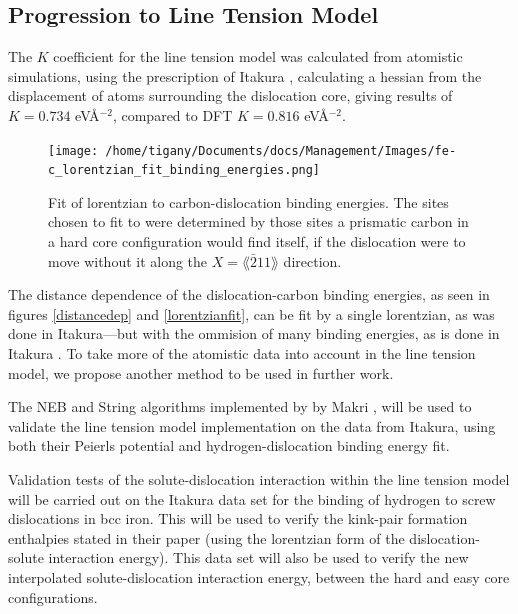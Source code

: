 \documentclass[a4paper,11pt]{article}
\begin{document}
\subsection{Progression to Line Tension Model}
\label{sec:org66fee0b}


The \(K\) coefficient for the line tension model  was calculated from atomistic simulations, using the prescription of Itakura \cite{Itakura2012},
calculating a hessian from the displacement of atoms surrounding the dislocation core, giving
results of \(K = 0.734\) eV\AA{}\(^{-2}\), compared to DFT \(K = 0.816\) eV\AA{}\(^{-2}\). 

\begin{figure}[htbp]
\centering
\texttt{[image: /home/tigany/Documents/docs/Management/Images/fe-c\_lorentzian\_fit\_binding\_energies.png]}
\caption{\label{fig:org45c8381}
Fit of lorentzian to carbon-dislocation binding energies. The sites chosen to fit to were determined by those sites a prismatic carbon in a hard core configuration would find itself, if the dislocation were to move without it along the \(X = \lang\bar{2}11\rang\) direction.}
\end{figure}



The distance dependence of the dislocation-carbon binding energies,
as seen in figures \ref{distancedep} and \ref{lorentzianfit}, can be fit by a
single lorentzian, as was done in Itakura---but with the ommision
of many binding energies, as is done in Itakura
\cite{itakura13_effec_hydrog_atoms_screw_disloc}. To take more of the
atomistic data into account in the line tension model, we propose
another method to be used in further work.


The NEB and String algorithms implemented by by Makri \cite{Makri2019}, will be used to validate the line
tension model implementation on the data from Itakura, using both their Peierls potential
and hydrogen-dislocation binding energy fit.


Validation tests of the solute-dislocation interaction within the line tension model will be carried
out on the Itakura data set for the binding of hydrogen to screw dislocations in bcc iron. This
will be used to verify the kink-pair formation enthalpies stated in their paper (using the
lorentzian form of the dislocation-solute interaction energy). This data set will also be used to
verify the new interpolated solute-dislocation interaction energy, between
the hard and easy core configurations.
\end{document}
